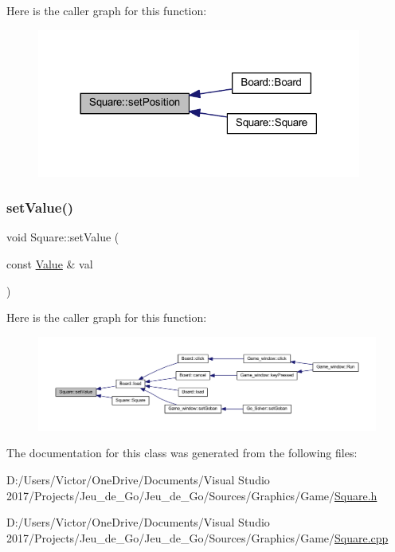 Here is the caller graph for this function\+:
\nopagebreak
\begin{figure}[H]
\begin{center}
\leavevmode
\includegraphics[width=302pt]{class_square_a9040f1ca39b88b8d9ac2a90648b1fb20_icgraph}
\end{center}
\end{figure}
\mbox{\label{class_square_a5fa0cbfce721c687308eec8e1a029d25}} 
\subsubsection{\texorpdfstring{set\+Value()}{setValue()}}
{\footnotesize\ttfamily void Square\+::set\+Value (\begin{DoxyParamCaption}\item[{const \hyperlink{class_square_a7feeec236c037a9849114226adaa4ecc}{Value} \&}]{val }\end{DoxyParamCaption})}

Here is the caller graph for this function\+:
\nopagebreak
\begin{figure}[H]
\begin{center}
\leavevmode
\includegraphics[width=350pt]{class_square_a5fa0cbfce721c687308eec8e1a029d25_icgraph}
\end{center}
\end{figure}


The documentation for this class was generated from the following files\+:\begin{DoxyCompactItemize}
\item 
D\+:/\+Users/\+Victor/\+One\+Drive/\+Documents/\+Visual Studio 2017/\+Projects/\+Jeu\+\_\+de\+\_\+\+Go/\+Jeu\+\_\+de\+\_\+\+Go/\+Sources/\+Graphics/\+Game/\hyperlink{_square_8h}{Square.\+h}\item 
D\+:/\+Users/\+Victor/\+One\+Drive/\+Documents/\+Visual Studio 2017/\+Projects/\+Jeu\+\_\+de\+\_\+\+Go/\+Jeu\+\_\+de\+\_\+\+Go/\+Sources/\+Graphics/\+Game/\hyperlink{_square_8cpp}{Square.\+cpp}\end{DoxyCompactItemize}
